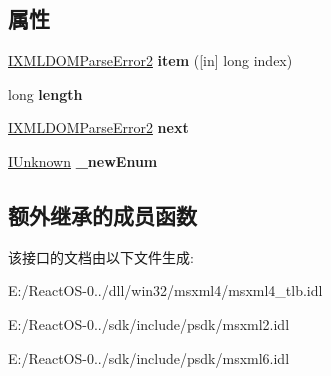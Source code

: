 \subsection*{属性}
\begin{DoxyCompactItemize}
\item 
\mbox{\label{interface_m_s_x_m_l2_1_1_i_x_m_l_d_o_m_parse_error_collection_ab7f37d19162d756d014c80e282837be9}} 
\hyperlink{interface_m_s_x_m_l2_1_1_i_x_m_l_d_o_m_parse_error2}{I\+X\+M\+L\+D\+O\+M\+Parse\+Error2} {\bfseries item} (\mbox{[}in\mbox{]} long index)
\item 
\mbox{\label{interface_m_s_x_m_l2_1_1_i_x_m_l_d_o_m_parse_error_collection_ad62fc09681572efc59798a760bdfa7ea}} 
long {\bfseries length}
\item 
\mbox{\label{interface_m_s_x_m_l2_1_1_i_x_m_l_d_o_m_parse_error_collection_a063e41c9ecc8824e2a4e8e07627b697f}} 
\hyperlink{interface_m_s_x_m_l2_1_1_i_x_m_l_d_o_m_parse_error2}{I\+X\+M\+L\+D\+O\+M\+Parse\+Error2} {\bfseries next}
\item 
\mbox{\label{interface_m_s_x_m_l2_1_1_i_x_m_l_d_o_m_parse_error_collection_a54d97358691e4afdad5a9cc119f752aa}} 
\hyperlink{interface_i_unknown}{I\+Unknown} {\bfseries \+\_\+new\+Enum}
\end{DoxyCompactItemize}
\subsection*{额外继承的成员函数}


该接口的文档由以下文件生成\+:\begin{DoxyCompactItemize}
\item 
E\+:/\+React\+O\+S-\/0../dll/win32/msxml4/msxml4\+\_\+tlb.\+idl\item 
E\+:/\+React\+O\+S-\/0../sdk/include/psdk/msxml2.\+idl\item 
E\+:/\+React\+O\+S-\/0../sdk/include/psdk/msxml6.\+idl\end{DoxyCompactItemize}
